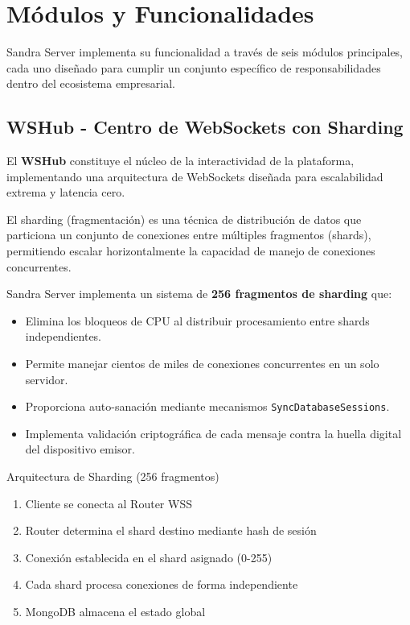 \newpage

\section{Módulos y Funcionalidades}

Sandra Server implementa su funcionalidad a través de seis módulos principales, cada uno diseñado para cumplir un conjunto específico de responsabilidades dentro del ecosistema empresarial.

\subsection{WSHub - Centro de WebSockets con Sharding}

El \textbf{WSHub} constituye el núcleo de la interactividad de la plataforma, implementando una arquitectura de WebSockets diseñada para escalabilidad extrema y latencia cero.

\begin{definicion}
El sharding (fragmentación) es una técnica de distribución de datos que particiona un conjunto de conexiones entre múltiples fragmentos (shards), permitiendo escalar horizontalmente la capacidad de manejo de conexiones concurrentes.
\end{definicion}

Sandra Server implementa un sistema de \textbf{256 fragmentos de sharding} que:

\begin{itemize}
\item Elimina los bloqueos de CPU al distribuir procesamiento entre shards independientes.
\item Permite manejar cientos de miles de conexiones concurrentes en un solo servidor.
\item Proporciona auto-sanación mediante mecanismos \texttt{SyncDatabaseSessions}.
\item Implementa validación criptográfica de cada mensaje contra la huella digital del dispositivo emisor.
\end{itemize}

\begin{caja}{Arquitectura de Sharding (256 fragmentos)}
\begin{enumerate}
\item Cliente se conecta al Router WSS
\item Router determina el shard destino mediante hash de sesión
\item Conexión establecida en el shard asignado (0-255)
\item Cada shard procesa conexiones de forma independiente
\item MongoDB almacena el estado global
\end{enumerate}
\end{caja}

